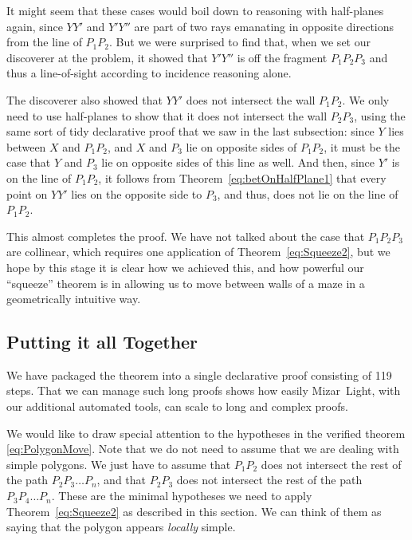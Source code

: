 It might seem that these cases would boil down to reasoning with half-planes again, since $YY'$ and $Y'Y''$ are part of two rays emanating in opposite directions from the line of $P_1P_2$. But we were surprised to find that, when we set our discoverer at the problem, it showed that $Y'Y''$ is off the fragment $P_1P_2P_3$ and thus a line-of-sight according to incidence reasoning alone.

The discoverer also showed that $YY'$ does not intersect the wall $P_1P_2$. We only need to use half-planes to show that it does not intersect the wall $P_2P_3$, using the same sort of tidy declarative proof that we saw in the last subsection: since $Y$ lies between $X$ and $P_1P_2$, and $X$ and $P_3$ lie on opposite sides of $P_1P_2$, it must be the case that $Y$ and $P_3$ lie on opposite sides of this line as well. And then, since $Y'$ is on the line of $P_1P_2$, it follows from Theorem~\ref{eq:betOnHalfPlane1} that every point on $YY'$ lies on the opposite side to $P_3$, and thus, does not lie on the line of $P_1P_2$. 

This almost completes the proof. We have not talked about the case that $P_1P_2P_3$ are collinear, which requires one application of Theorem~\ref{eq:Squeeze2}, but we hope by this stage it is clear how we achieved this, and how powerful our ``squeeze'' theorem is in allowing us to move between walls of a maze in a geometrically intuitive way.

\subsection{Putting it all Together}
We have packaged the theorem into a single declarative proof consisting of 119 steps. That we can manage such long proofs shows how easily Mizar~Light, with our additional automated tools, can scale to long and complex proofs. 

We would like to draw special attention to the hypotheses in the verified theorem \eqref{eq:PolygonMove}. Note that we do not need to assume that we are dealing with simple polygons. We just have to assume that $P_1P_2$ does not intersect the rest of the path $P_2P_3\ldots P_n$, and that $P_2P_3$ does not intersect the rest of the path $P_3P_4\ldots P_n$. These are the minimal hypotheses we need to apply Theorem~\ref{eq:Squeeze2} as described in this section. We can think of them as saying that the polygon appears \emph{locally} simple.

